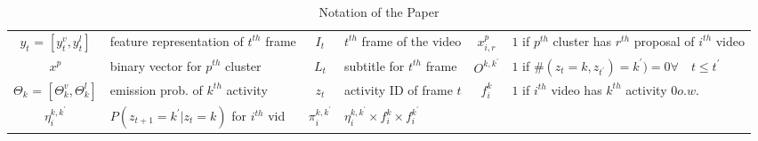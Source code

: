 \setlength{\tabcolsep}{1mm}
\begin{table*}
\footnotesize
\centering
\caption{Notation of the Paper}
\begin{tabular}{|cp{4cm}|cp{3cm}|cp{5cm}|}
  \hline
$y_t$ = $\left[y_t^v,y_t^l\right]$ & feature representation of $t^{th}$ frame & $I_t$ & $t^{th}$ frame of the video & $x^p_{i,r}$ & $1$ if $p^{th}$ cluster has $r^{th}$ proposal of $i^{th}$ video  \\
$x^p$ & binary vector for $p^{th}$ cluster & $L_t$ & subtitle for $t^{th}$ frame & $O^{k,k^\prime}$ & $1$ if $\#(z_t=k,z_{t^\prime})=k^\prime) = 0 \forall\quad t \leq t^\prime$ \\
$\Theta_k$ = $\left[\Theta_k^v,\Theta_k^l\right]$ & emission prob. of $k^{th}$ activity & $z_t$ & activity ID of frame  $t$ & $f_i^k$ & $1$ if $i^{th}$ video has $k^{th}$ activity $0 o.w.$ \\
$\eta_i^{k,k^\prime}$ & $P(z_{t+1}=k^\prime|z_{t}=k)$ for $i^{th}$ vid & $\pi_i^{k,k^\prime}$ & $\eta_i^{k,k^\prime} \times f_i^k \times f_i^{k^\prime}$
& & \\ \hline
\end{tabular}
\end{table*}
\normalsize
